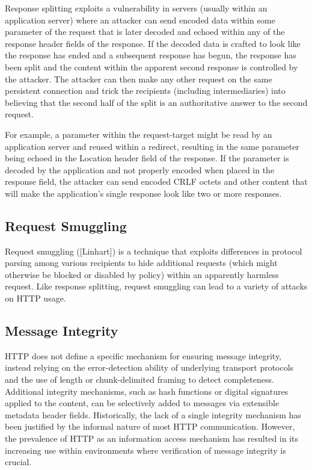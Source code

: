 Response splitting exploits a vulnerability in servers (usually
within an application server) where an attacker can send encoded data
within some parameter of the request that is later decoded and echoed
within any of the response header fields of the response.  If the
decoded data is crafted to look like the response has ended and a
subsequent response has begun, the response has been split and the
content within the apparent second response is controlled by the
attacker.  The attacker can then make any other request on the same
persistent connection and trick the recipients (including
intermediaries) into believing that the second half of the split is
an authoritative answer to the second request.

For example, a parameter within the request-target might be read by
an application server and reused within a redirect, resulting in the
same parameter being echoed in the Location header field of the
response.  If the parameter is decoded by the application and not
properly encoded when placed in the response field, the attacker can
send encoded CRLF octets and other content that will make the
application's single response look like two or more responses.


\subsection{Request Smuggling}

Request smuggling ([Linhart]) is a technique that exploits
differences in protocol parsing among various recipients to hide
additional requests (which might otherwise be blocked or disabled by
policy) within an apparently harmless request.  Like response
splitting, request smuggling can lead to a variety of attacks on HTTP
usage.


\subsection{Message Integrity}

HTTP does not define a specific mechanism for ensuring message
integrity, instead relying on the error-detection ability of
underlying transport protocols and the use of length or
chunk-delimited framing to detect completeness.  Additional integrity
mechanisms, such as hash functions or digital signatures applied to
the content, can be selectively added to messages via extensible
metadata header fields.  Historically, the lack of a single integrity
mechanism has been justified by the informal nature of most HTTP
communication.  However, the prevalence of HTTP as an information
access mechanism has resulted in its increasing use within
environments where verification of message integrity is crucial.

